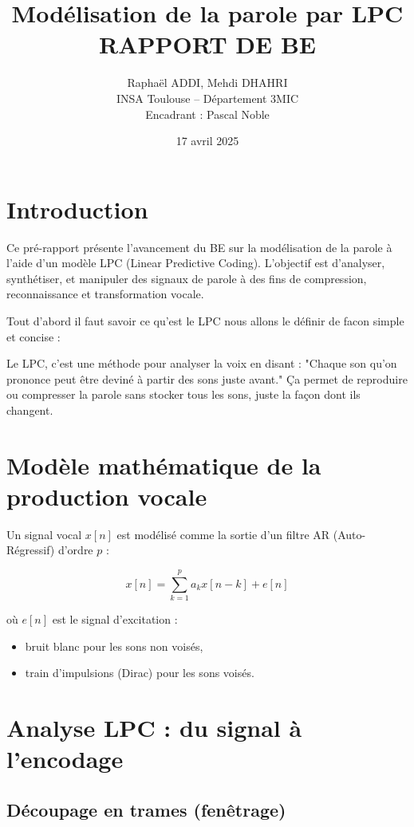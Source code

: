 \documentclass[11pt]{article}
\title{Modélisation de la parole par LPC \\[0.5em]
\large RAPPORT DE BE}
\author{Raphaël ADDI, Mehdi DHAHRI \\
INSA Toulouse – Département 3MIC \\
Encadrant : Pascal Noble}
\date{17 avril 2025}
\begin{document}
\maketitle
\thispagestyle{empty}
\newpage

\tableofcontents
\newpage

\section{Introduction}

Ce pré-rapport présente l’avancement du BE sur la modélisation de la parole à l’aide d’un modèle LPC (Linear Predictive Coding). L’objectif est d’analyser, synthétiser, et manipuler des signaux de parole à des fins de compression, reconnaissance et transformation vocale.

Tout d'abord il faut savoir ce qu'est le LPC nous allons le définir de facon simple et concise : 

Le LPC, c’est une méthode pour analyser la voix en disant :
"Chaque son qu’on prononce peut être deviné à partir des sons juste avant."
Ça permet de reproduire ou compresser la parole sans stocker tous les sons, juste la façon dont ils changent.

\section{Modèle mathématique de la production vocale}

Un signal vocal \( x[n] \) est modélisé comme la sortie d’un filtre AR (Auto-Régressif) d’ordre \( p \) :

\[
x[n] = \sum_{k=1}^{p} a_k x[n-k] + e[n]
\]

où \( e[n] \) est le signal d’excitation :
\begin{itemize}
    \item bruit blanc pour les sons non voisés,
    \item train d’impulsions (Dirac) pour les sons voisés.
\end{itemize}

\section{Analyse LPC : du signal à l'encodage}

\subsection{Découpage en trames (fenêtrage)}
\end{document}
